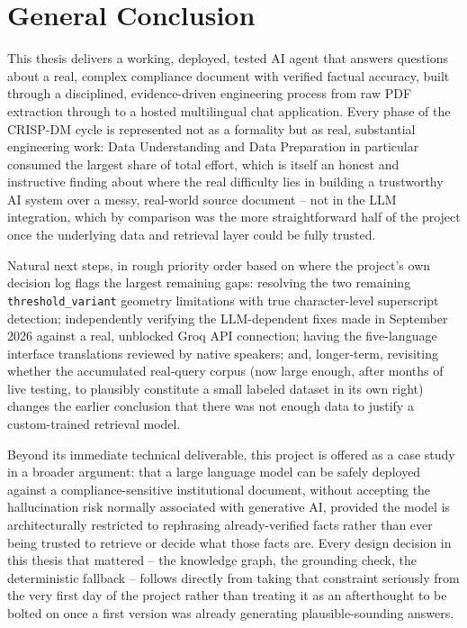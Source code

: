 \chapter*{General Conclusion}

This thesis delivers a working, deployed, tested AI agent that answers questions about a real, complex compliance document with verified factual accuracy, built through a disciplined, evidence-driven engineering process from raw PDF extraction through to a hosted multilingual chat application. Every phase of the CRISP-DM cycle is represented not as a formality but as real, substantial engineering work: Data Understanding and Data Preparation in particular consumed the largest share of total effort, which is itself an honest and instructive finding about where the real difficulty lies in building a trustworthy AI system over a messy, real-world source document -- not in the LLM integration, which by comparison was the more straightforward half of the project once the underlying data and retrieval layer could be fully trusted.

Natural next steps, in rough priority order based on where the project's own decision log flags the largest remaining gaps: resolving the two remaining \texttt{threshold\_variant} geometry limitations with true character-level superscript detection; independently verifying the LLM-dependent fixes made in September 2026 against a real, unblocked Groq API connection; having the five-language interface translations reviewed by native speakers; and, longer-term, revisiting whether the accumulated real-query corpus (now large enough, after months of live testing, to plausibly constitute a small labeled dataset in its own right) changes the earlier conclusion that there was not enough data to justify a custom-trained retrieval model.

Beyond its immediate technical deliverable, this project is offered as a case study in a broader argument: that a large language model can be safely deployed against a compliance-sensitive institutional document, without accepting the hallucination risk normally associated with generative AI, provided the model is architecturally restricted to rephrasing already-verified facts rather than ever being trusted to retrieve or decide what those facts are. Every design decision in this thesis that mattered -- the knowledge graph, the grounding check, the deterministic fallback -- follows directly from taking that constraint seriously from the very first day of the project rather than treating it as an afterthought to be bolted on once a first version was already generating plausible-sounding answers.
